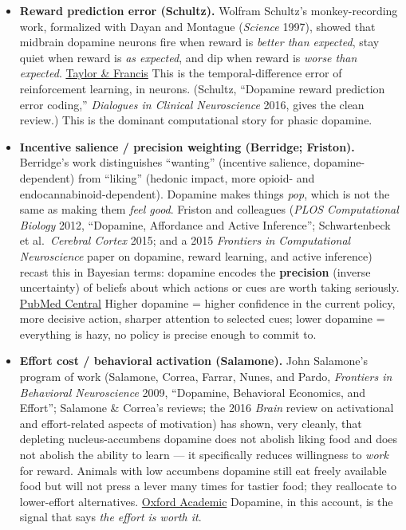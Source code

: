 \begin{itemize}
\item
  \textbf{Reward prediction error (Schultz).} Wolfram Schultz's monkey-recording work, formalized with Dayan and Montague (\emph{Science} 1997), showed that midbrain dopamine neurons fire when reward is \emph{better than expected}, stay quiet when reward is \emph{as expected}, and dip when reward is \emph{worse than expected}. \href{https://www.tandfonline.com/doi/full/10.31887/DCNS.2016.18.1/wschultz}{Taylor \& Francis} This is the temporal-difference error of reinforcement learning, in neurons. (Schultz, ``Dopamine reward prediction error coding,'' \emph{Dialogues in Clinical Neuroscience} 2016, gives the clean review.) This is the dominant computational story for phasic dopamine.
\item
  \textbf{Incentive salience / precision weighting (Berridge; Friston).} Berridge's work distinguishes ``wanting'' (incentive salience, dopamine-dependent) from ``liking'' (hedonic impact, more opioid- and endocannabinoid-dependent). Dopamine makes things \emph{pop}, which is not the same as making them \emph{feel good}. Friston and colleagues (\emph{PLOS Computational Biology} 2012, ``Dopamine, Affordance and Active Inference''; Schwartenbeck et al.~\emph{Cerebral Cortex} 2015; and a 2015 \emph{Frontiers in Computational Neuroscience} paper on dopamine, reward learning, and active inference) recast this in Bayesian terms: dopamine encodes the \textbf{precision} (inverse uncertainty) of beliefs about which actions or cues are worth taking seriously. \href{https://pmc.ncbi.nlm.nih.gov/articles/PMC3252266/}{PubMed Central} Higher dopamine = higher confidence in the current policy, more decisive action, sharper attention to selected cues; lower dopamine = everything is hazy, no policy is precise enough to commit to.
\item
  \textbf{Effort cost / behavioral activation (Salamone).} John Salamone's program of work (Salamone, Correa, Farrar, Nunes, and Pardo, \emph{Frontiers in Behavioral Neuroscience} 2009, ``Dopamine, Behavioral Economics, and Effort''; Salamone \& Correa's reviews; the 2016 \emph{Brain} review on activational and effort-related aspects of motivation) has shown, very cleanly, that depleting nucleus-accumbens dopamine does not abolish liking food and does not abolish the ability to learn --- it specifically reduces willingness to \emph{work} for reward. Animals with low accumbens dopamine still eat freely available food but will not press a lever many times for tastier food; they reallocate to lower-effort alternatives. \href{https://academic.oup.com/brain/article/139/5/1325/2468761}{Oxford Academic} Dopamine, in this account, is the signal that says \emph{the effort is worth it}.
\end{itemize}

